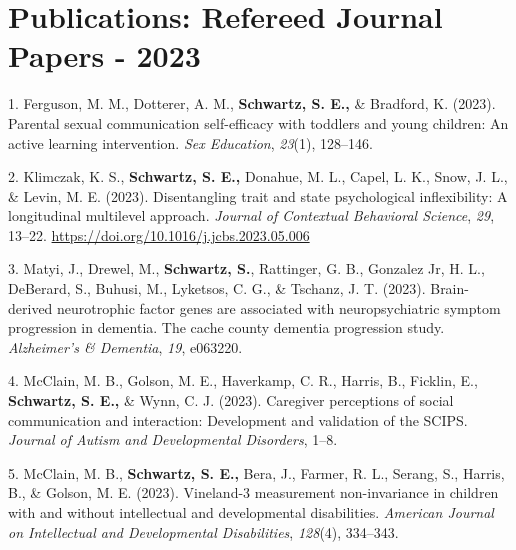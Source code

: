 \documentclass[11pt,a4paper,]{moderncv}
\newlength{\cslhangindent}
\newenvironment{CSLReferences}[2] %
 {\begin{list}{}{%
  \setlength{\itemindent}{0pt}
  \setlength{\leftmargin}{0pt}
  \setlength{\parsep}{0pt}
  \ifodd #1
   \setlength{\leftmargin}{\cslhangindent}
   \setlength{\itemindent}{-1\cslhangindent}
  \fi
  \setlength{\itemsep}{#2\baselineskip}}}
 {\end{list}}
\begin{document}
\section{Publications: Refereed Journal Papers -
2023}\label{publications-refereed-journal-papers---2023}

\begingroup
\setlength{\parindent}{-0.5in}
\setlength{\leftskip}{0.5in}

\label{refs-f543890390c5a2fcbbd5b6f354699d24}
\begin{CSLReferences}{1}{0}
1. Ferguson, M. M., Dotterer, A. M., \textbf{Schwartz, S. E.,} \&
Bradford, K. (2023). Parental sexual communication self-efficacy with
toddlers and young children: An active learning intervention. \emph{Sex
Education}, \emph{23}(1), 128--146.

2. Klimczak, K. S., \textbf{Schwartz, S. E.,} Donahue, M. L., Capel, L.
K., Snow, J. L., \& Levin, M. E. (2023). Disentangling trait and state
psychological inflexibility: A longitudinal multilevel approach.
\emph{Journal of Contextual Behavioral Science}, \emph{29}, 13--22.
\url{https://doi.org/10.1016/j.jcbs.2023.05.006}

3. Matyi, J., Drewel, M., \textbf{Schwartz, S.}, Rattinger, G. B.,
Gonzalez Jr, H. L., DeBerard, S., Buhusi, M., Lyketsos, C. G., \&
Tschanz, J. T. (2023). Brain-derived neurotrophic factor genes are
associated with neuropsychiatric symptom progression in dementia. The
cache county dementia progression study. \emph{Alzheimer's \& Dementia},
\emph{19}, e063220.

4. McClain, M. B., Golson, M. E., Haverkamp, C. R., Harris, B., Ficklin,
E., \textbf{Schwartz, S. E.,} \& Wynn, C. J. (2023). Caregiver
perceptions of social communication and interaction: Development and
validation of the SCIPS. \emph{Journal of Autism and Developmental
Disorders}, 1--8.

5. McClain, M. B., \textbf{Schwartz, S. E.,} Bera, J., Farmer, R. L.,
Serang, S., Harris, B., \& Golson, M. E. (2023). Vineland-3 measurement
non-invariance in children with and without intellectual and
developmental disabilities. \emph{American Journal on Intellectual and
Developmental Disabilities}, \emph{128}(4), 334--343.

\end{CSLReferences}
\end{document}

